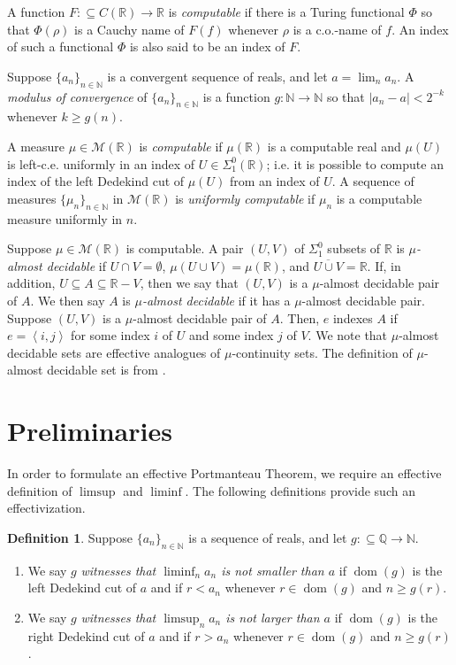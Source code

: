 \documentclass{amsart}
\newcommand{\Q}{\mathbb{Q}}
\newcommand{\R}{\mathbb{R}}
\newcommand{\N}{\mathbb{N}}
\newcommand{\dom}{\operatorname{dom}}
\newcommand{\M}{\mathcal{M}}
\newcommand{\ol}{\overline}
\theoremstyle{definition}
\newtheorem{definition}[theorem]{Definition}
\numberwithin{equation}{section}
\begin{document}
A function $F:\subseteq C(\R)\rightarrow\R$ is \emph{computable} if there is a Turing functional $\Phi$ 
so that $\Phi(\rho)$ is a Cauchy name of $F(f)$ whenever $\rho$ is a c.o.-name of $f$.  
An index of such a functional $\Phi$ is also said to be an index of $F$.

Suppose $\{a_n\}_{n \in \N}$ is a convergent sequence of reals, and let $a = \lim_n a_n$.  A \emph{modulus of convergence} of $\{a_n\}_{n \in \N}$ is a function $g : \N \rightarrow \N$ so that $|a_n - a| < 2^{-k}$ whenever $k \geq g(n)$.  

A measure $\mu\in\M(\R)$ is \emph{computable} if $\mu(\R)$ is a computable real and $\mu(U)$ is left-c.e. uniformly in an index of $U\in\Sigma^0_1(\R)$;  i.e. it is possible to compute an index of the left Dedekind cut of $\mu(U)$ from an index of $U$.  A sequence of measures $\{\mu_n\}_{n\in\N}$ in $\M(\R)$ is \emph{uniformly computable} if $\mu_n$ is a computable measure uniformly in $n$.

Suppose $\mu \in \M(\R)$ is computable.  A pair $(U,V)$ of $\Sigma^0_1$ subsets of $\R$ is \emph{$\mu$-almost decidable} if $U\cap V=\emptyset$, $\mu(U\cup V)=\mu(\R)$, and $\ol{U\cup V}=\R$.  
If, in addition, $U \subseteq A \subseteq \R - V$, then we say that $(U,V)$ is a $\mu$-almost decidable pair of $A$.  
We then say $A$ is \emph{$\mu$-almost decidable} if it has a $\mu$-almost decidable pair. 
Suppose $(U,V)$ is a $\mu$-almost decidable pair of $A$. Then, $e$ indexes $A$ if $e=\left<i,j\right>$ for some index $i$ of $U$ and some index $j$ of $V$.  We note that $\mu$-almost decidable sets are effective analogues of $\mu$-continuity sets.  The definition of $\mu$-almost decidable set is from \cite{R18}.

\section{Preliminaries}\label{sec:prelim}

In order to formulate an effective Portmanteau Theorem, we require an effective definition of $\limsup$ and $\liminf$. 
The following definitions provide such an effectivization.

\begin{definition}\label{def:wit.lwr.upr}
Suppose $\{a_n\}_{n \in \N}$ is a sequence of reals, and let $g : \subseteq \Q \rightarrow \N$.
\begin{enumerate}
	\item We say $g$ \emph{witnesses that $\liminf_n a_n$ is not smaller than $a$} if $\dom(g)$ is the left Dedekind cut of $a$ and if $r < a_n$ whenever $r \in \dom(g)$ and $n \geq g(r)$.
	
	\item We say $g$ \emph{witnesses that $\limsup_n a_n$ is not larger than $a$} if $\dom(g)$ is the right Dedekind cut of $a$ and if $r > a_n$ whenever $r \in \dom(g)$ and $n \geq g(r)$.
\end{enumerate}
\end{definition}
\end{document}
